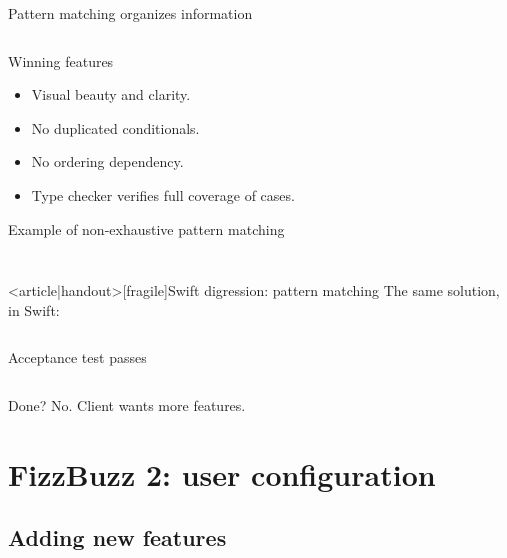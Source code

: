 \begin{frame}[fragile]{Pattern matching organizes information}
  \inputminted[gobble=2]{scala}{FizzBuzz2.scala}

  \begin{block}{Winning features}
    \begin{itemize}
    \item Visual \alert{beauty} and clarity.
    \item No duplicated conditionals.
    \item No ordering dependency.
    \item \alert{Type checker} verifies \alert{full coverage} of cases.
    \end{itemize}
  \end{block}
\end{frame}

\begin{frame}[fragile]{Example of non-exhaustive pattern matching}
  \inputminted[gobble=2]{scala}{FizzBuzz2Bad.scala}

  \inputminted{console}{testQuick4.console}
\end{frame}

\begin{frame}<article|handout>[fragile]{Swift digression: pattern matching}
  The same solution, in Swift:

  \inputminted{swift}{FizzBuzz2.swift}
\end{frame}

\begin{frame}[fragile]{Acceptance test passes}

  \inputminted{console}{testQuick5.console}

  \begin{block}{Done?}
    No. Client wants more features.
  \end{block}
\end{frame}

\section{FizzBuzz 2: user configuration}

\subsection{Adding new features}

